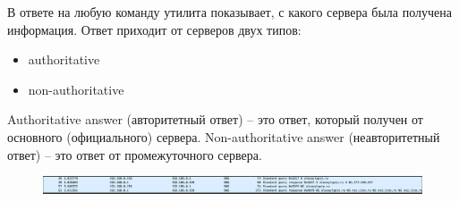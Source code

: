 \documentclass[12pt,onecolumn]{article}
\begin{document}
В ответе на любую команду утилита показывает, с какого сервера была получена информация. Ответ приходит от серверов двух типов:

\begin{itemize}
    \item authoritative
    \item non-authoritative
\end{itemize}

Authoritative answer (авторитетный ответ) – это ответ, который получен от основного (официального) сервера. Non-authoritative answer (неавторитетный ответ) – это ответ от промежуточного сервера.

\begin{figure}[H]
    \centering
    \includegraphics*[width=\textwidth]{image/part6/dns.png}
\end{figure}
\end{document}
